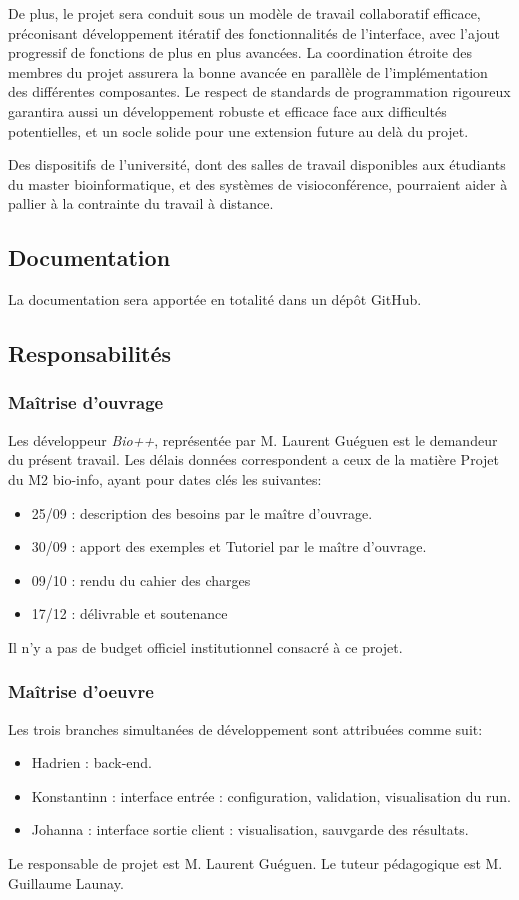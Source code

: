 De plus, le projet sera conduit
sous un modèle de travail collaboratif efficace,
préconisant développement itératif des fonctionnalités de l'interface,
avec l'ajout progressif de fonctions de plus en plus avancées.
La coordination étroite des membres du projet
assurera la bonne avancée en parallèle de l'implémentation des différentes composantes.
Le respect de standards de programmation rigoureux
garantira aussi un développement robuste et efficace face aux difficultés potentielles,
et un socle solide pour une extension future au delà du projet.

Des dispositifs de l'université,
dont des salles de travail disponibles aux étudiants du master bioinformatique,
et des systèmes de visioconférence,
pourraient aider à pallier à la contrainte du travail à distance.

 
\subsection{Documentation} 
La documentation sera apportée en totalité dans un dépôt GitHub.

	
\subsection{Responsabilités}
\subsubsection{Maîtrise d'ouvrage}
Les développeur \textit{Bio++}, représentée par M. Laurent Guéguen est le
 demandeur du présent travail. Les délais données correspondent a ceux de la matière 
 Projet du M2 bio-info, ayant pour dates clés les suivantes:
\begin{itemize}
	\item 25/09 : description des besoins par le maître d'ouvrage.
	\item 30/09 : apport des exemples et Tutoriel par le maître d'ouvrage.
	\item 09/10 : rendu du cahier des charges 
	\item 17/12 : délivrable et soutenance 
\end{itemize}
Il n'y a pas de budget officiel institutionnel consacré à ce projet. 

\subsubsection{Maîtrise d'oeuvre}

Les trois branches simultanées de développement sont attribuées comme suit:

\begin{itemize}
	\item Hadrien : back-end.
	\item Konstantinn : interface entrée : configuration, validation, visualisation du run.
	\item Johanna : interface sortie client : visualisation, sauvgarde des résultats.
\end{itemize}

Le responsable de projet est M. Laurent Guéguen.
Le tuteur pédagogique est M. Guillaume Launay.

%
